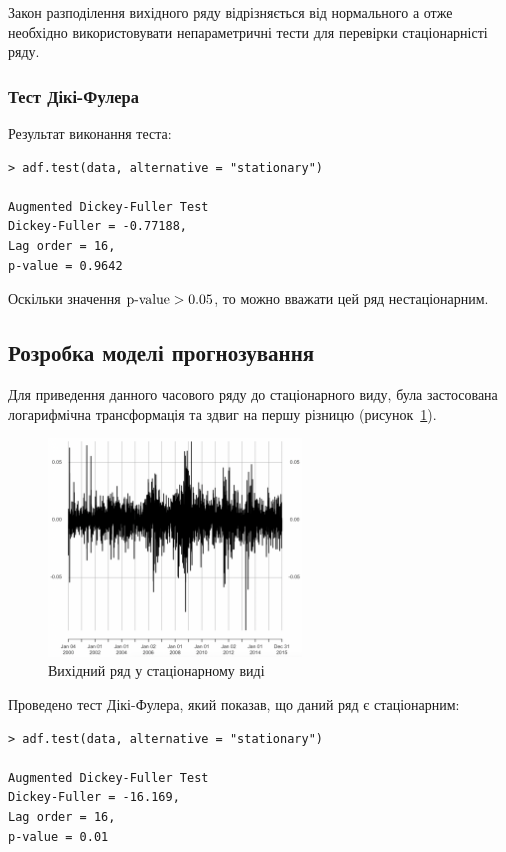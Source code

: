 Закон разподілення вихідного ряду відрізняється від нормального а отже необхідно використовувати непараметричні тести для перевірки стаціонарністі ряду.

\subsubsection{Тест Дікі-Фулера}
Результат виконання теста:  
\begin{lstlisting}
> adf.test(data, alternative = "stationary") 

Augmented Dickey-Fuller Test
Dickey-Fuller = -0.77188, 
Lag order = 16, 
p-value = 0.9642
\end{lstlisting}

Оскільки значення $\textup{p-value} > 0.05$, то можно вважати цей ряд нестаціонарним. 

\subsection{Розробка моделі прогнозування}
Для приведення данного часового ряду до стаціонарного виду, була застосована логарифмічна трансформація та здвиг на першу різницю (рисунок~\ref{fig:temp}).  

\begin{figure}[H]
    \centering
        \includegraphics[width=0.6\textwidth]{temp}
    \caption{Вихідний ряд у стаціонарному виді}
    \label{fig:temp}
\end{figure} 

Проведено тест Дікі-Фулера, який показав, що даний ряд є стаціонарним:
\begin{lstlisting}
> adf.test(data, alternative = "stationary") 

Augmented Dickey-Fuller Test
Dickey-Fuller = -16.169, 
Lag order = 16, 
p-value = 0.01
\end{lstlisting}

